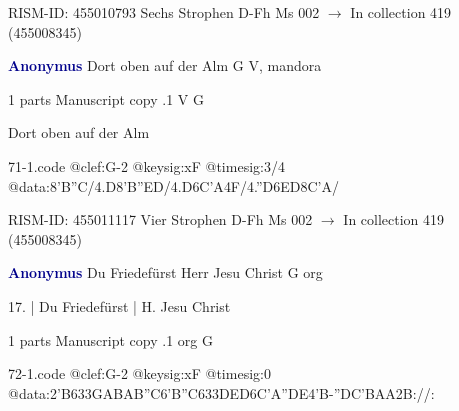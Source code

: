 \documentclass[twocolumn]{book}
\begin{document}
\newline RISM-ID: 455010793
\newline Sechs Strophen
\newline D-Fh  Ms 002
\newline $\rightarrow$ In collection 419 (455008345)

\newline \par \vspace{7pt} \textcolor{darkblue}{\textbf{Anonymus  }}
\newline Dort oben auf der Alm  G  
\newline V, mandora
\newline \begin{itshape}\end{itshape} 
\newline \textcolor{darkblue}{}  1 parts  
\newline Manuscript copy
.1  V  G
\newline \begin{footnotesize} Dort oben auf der Alm \end{footnotesize}  
\begin{filecontents*}{71-1.code}
@clef:G-2
@keysig:xF
@timesig:3/4
@data:{8'B''C}/4.D8'B''ED/4.D{6C'A}4F/4.''D{6ED}{8C'A}/
\end{filecontents*}
\newline
%

\newline RISM-ID: 455011117
\newline Vier Strophen
\newline D-Fh  Ms 002
\newline $\rightarrow$ In collection 419 (455008345)

\newline \par \vspace{7pt} \textcolor{darkblue}{\textbf{Anonymus  }}
\newline Du Friedefürst Herr Jesu Christ  G  
\newline org
\newline \begin{itshape}[f.11r, at left:] 17. | Du Friedefürst | H. Jesu Christ\end{itshape} 
\newline \textcolor{darkblue}{}  1 parts  
\newline Manuscript copy
.1  org  G  
\begin{filecontents*}{72-1.code}
@clef:G-2
@keysig:xF
@timesig:0
@data:2'B{633GAB}{AB''C}{6'B''C}{633DED}{6C'A''DE}4'B-''DC'BAA2B://:
\end{filecontents*}
\newline
%
\end{document}
